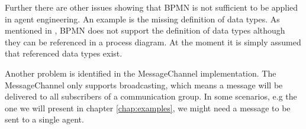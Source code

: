 Further there are other issues showing that BPMN is not sufficient to be applied in agent engineering. An example is the missing definition of data types. As mentioned in \cite{TKMLAH2010}, BPMN does not support the definition of data types although they can be referenced in a process diagram. At the moment it is simply assumed that referenced data types exist.

Another problem is identified in the MessageChannel implementation. The MessageChannel only supports broadcasting, which means a message will be delivered to all subscribers of a communication group. In some scenarios, e.g the one we will present in chapter \ref{chap:examples}, we might need a message to be sent to a single agent.  